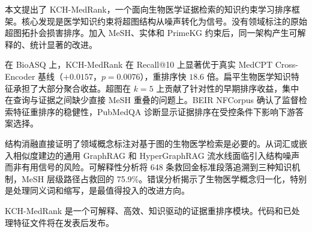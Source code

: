 本文提出了 KCH-MedRank，一个面向生物医学证据检索的知识约束学习排序框架。核心发现是医学知识约束将超图结构从噪声转化为信号。没有领域标注的原始超图拓扑会损害排序。加入 MeSH、实体和 PrimeKG 约束后，同一架构产生可解释的、统计显著的改进。

在 BioASQ 上，KCH-MedRank 在 Recall@10 上显著优于真实 MedCPT Cross-Encoder 基线（$+0.0157$，$p=0.0076$），重排序快 $18.6$ 倍。扁平生物医学知识特征承担了大部分聚合收益。超图在 $k{=}5$ 上贡献了针对性的早期排序收益，集中在查询与证据之间缺少直接 MeSH 重叠的问题上。BEIR NFCorpus 确认了监督检索特征重排序的稳健性，PubMedQA 诊断显示证据排序在受控条件下影响下游答案选择。

结构消融直接证明了领域概念标注对基于图的生物医学检索是必要的。从词汇或嵌入相似度建边的通用 GraphRAG 和 HyperGraphRAG 流水线面临引入结构噪声而非有用信号的风险。可解释性分析将 648 条救回金标准段落追溯到三种知识机制，MeSH 层级路径占救回的 75.9\%。错误分析揭示了生物医学概念归一化，特别是处理同义词和缩写，是最值得投入的改进方向。

KCH-MedRank 是一个可解释、高效、知识驱动的证据重排序模块。代码和已处理特征文件将在发表后发布。
